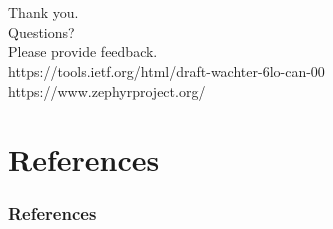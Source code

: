 \documentclass[aspectratio=169]{beamer}
\begin{document}
\section{}

\begin{frame}
	\frametitle{ }
	\vspace{40pt}
	{\Huge Thank you. \\ Questions?} \\
	\vspace{10pt}
	Please provide feedback. \\
	\vspace{20pt}
	https://tools.ietf.org/html/draft-wachter-6lo-can-00 \\
	https://www.zephyrproject.org/
\end{frame}

\section{References}
\begin{frame}
	\frametitle{References}
	\printbibliography
\end{frame}
\end{document}
